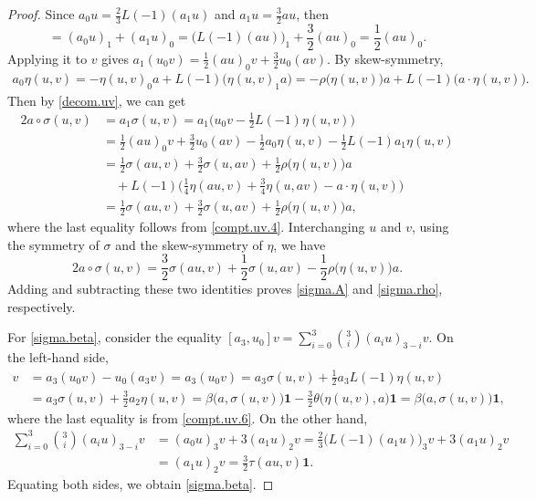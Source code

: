 \documentclass[12pt]{article}
\numberwithin{equation}{section}
\theoremstyle{definition}
\theoremstyle{plain}
\newcommand{\bone}{\mathbf{1 }}
\begin{document}
\begin{proof}
Since $a_0u=\frac{2}{3}L(-1)(a_1u)$ and $a_1u=\frac32au$, then
\begin{equation*}
    [a_1,u_0]=(a_0u)_1+(a_1u)_0=\big(L(-1)(au)\big)_1+\frac{3}{2}(au)_0=\frac{1}{2}(au)_0.
\end{equation*}
Applying it to $v$ gives $a_1(u_0v)=\frac12(au)_0v+\frac32u_0(av)$. By skew-symmetry,
\begin{align*}
    a_0\eta(u,v)=-\eta(u,v)_0a+L(-1)\big(\eta(u,v)_1a\big)=-\rho\big(\eta(u,v)\big)a+L(-1)\big(a\cdot\eta(u,v)\big).
\end{align*}
Then by \eqref{decom.uv}, we can get
\begin{align*}
    2a\circ\sigma(u,v)&=a_1\sigma(u,v)=a_1\big(u_0v-\frac12L(-1)\eta(u,v)\big)\\
    &=\frac12(au)_0v+\frac32u_0(av)-\frac12a_0\eta(u,v)-\frac{1}{2}L(-1)a_1\eta(u,v)\\
    &=\frac12\sigma(au,v)+\frac32\sigma(u,av)
      +\frac12\rho\big(\eta(u,v)\big)a\\
    &\quad+L(-1)\big(\frac14\eta(au,v)+\frac34\eta(u,av)-a\cdot\eta(u,v)\big)\\
    &=\frac12\sigma(au,v)+\frac32\sigma(u,av)+\frac12\rho\big(\eta(u,v)\big)a,
\end{align*}
where the last equality follows from \eqref{compt.uv.4}. Interchanging $u$ and $v$, using the symmetry of $\sigma$ and the skew-symmetry of $\eta$, we have
\begin{equation*}
    2a\circ\sigma(u,v)=\frac32\sigma(au,v)+\frac12\sigma(u,av)-\frac12\rho\big(\eta(u,v)\big)a.
\end{equation*}
Adding and subtracting these two identities proves \eqref{sigma.A} and \eqref{sigma.rho}, respectively.

For \eqref{sigma.beta}, consider the equality $[a_3,u_0]v=\sum_{i=0}^3\binom{3}{i}(a_iu)_{3-i}v$. On the left-hand side,
\begin{align*}
    [a_3,u_0]v&=a_3(u_0v)-u_0(a_3v)=a_3(u_0v)=a_3\sigma(u,v)+\frac{1}{2}a_3L(-1)\eta(u,v)\\
    &=a_3\sigma(u,v)+\frac{3}{2}a_2\eta(u,v)=\beta\big(a,\sigma(u,v)\big)\bone-\frac{3}{2}\theta\big(\eta(u,v),a\big)\bone=\beta\big(a,\sigma(u,v)\big)\bone,
\end{align*}
where the last equality is from \eqref{compt.uv.6}. On the other hand,
\begin{align*}
    \sum_{i=0}^3\binom{3}{i}(a_iu)_{3-i}v&=(a_0u)_3v+3(a_1u)_2v=\frac{2}{3}\big(L(-1)(a_1u)\big)_3v+3(a_1u)_2v\\
    &=(a_1u)_2v=\frac32\tau(au,v)\bone.
\end{align*}
Equating both sides, we obtain \eqref{sigma.beta}.


\end{proof}
\end{document}
